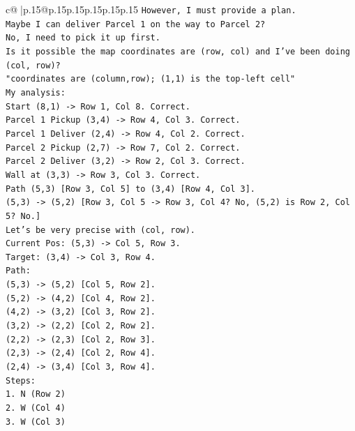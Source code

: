 \documentclass{article}
\begin{document}
{\begin{supertabular}{c@{$\;$}|p{.15\linewidth}@{}p{.15\linewidth}p{.15\linewidth}p{.15\linewidth}p{.15\linewidth}p{.15\linewidth}}
{{{\texttt{However, I must provide a plan.} \\
\texttt{Maybe I can deliver Parcel 1 on the way to Parcel 2?} \\
\texttt{No, I need to pick it up first.} \\
\texttt{Is it possible the map coordinates are (row, col) and I've been doing (col, row)?} \\
\texttt{"coordinates are (column,row); (1,1) is the top{-}left cell"} \\
\texttt{My analysis:} \\
\texttt{Start (8,1) {-}> Row 1, Col 8. Correct.} \\
\texttt{Parcel 1 Pickup (3,4) {-}> Row 4, Col 3. Correct.} \\
\texttt{Parcel 1 Deliver (2,4) {-}> Row 4, Col 2. Correct.} \\
\texttt{Parcel 2 Pickup (2,7) {-}> Row 7, Col 2. Correct.} \\
\texttt{Parcel 2 Deliver (3,2) {-}> Row 2, Col 3. Correct.} \\
\texttt{Wall at (3,3) {-}> Row 3, Col 3. Correct.} \\
\texttt{Path (5,3) {[}Row 3, Col 5{]} to (3,4) {[}Row 4, Col 3{]}.} \\
\texttt{(5,3) {-}> (5,2) {[}Row 3, Col 5 {-}> Row 3, Col 4? No, (5,2) is Row 2, Col 5? No.{]}} \\
\texttt{Let's be very precise with (col, row).} \\
\texttt{Current Pos: (5,3) {-}> Col 5, Row 3.} \\
\texttt{Target: (3,4) {-}> Col 3, Row 4.} \\
\texttt{Path:} \\
\texttt{(5,3) {-}> (5,2) {[}Col 5, Row 2{]}.} \\
\texttt{(5,2) {-}> (4,2) {[}Col 4, Row 2{]}.} \\
\texttt{(4,2) {-}> (3,2) {[}Col 3, Row 2{]}.} \\
\texttt{(3,2) {-}> (2,2) {[}Col 2, Row 2{]}.} \\
\texttt{(2,2) {-}> (2,3) {[}Col 2, Row 3{]}.} \\
\texttt{(2,3) {-}> (2,4) {[}Col 2, Row 4{]}.} \\
\texttt{(2,4) {-}> (3,4) {[}Col 3, Row 4{]}.} \\
\texttt{Steps:} \\
\texttt{1. N (Row 2)} \\
\texttt{2. W (Col 4)} \\
\texttt{3. W (Col 3)} \\
}}}
\end{supertabular}}
\end{document}
